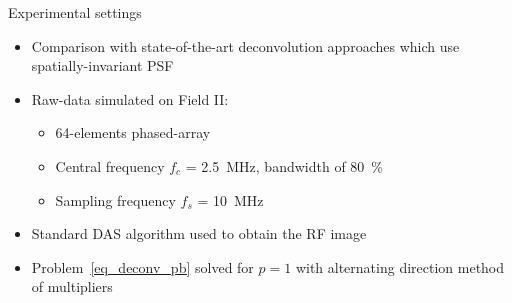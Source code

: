 {%
\begin{block}{Experimental settings}
	\begin{itemize}
		\item Comparison with state-of-the-art deconvolution approaches which use spatially-invariant PSF~\cite{Chen2015}
		\item Raw-data simulated on Field II:
		\begin{itemize}
			\item 64-elements phased-array
			\item Central frequency $f_c$ = \SI{2.5}{\mega\hertz}, bandwidth of \SI{80}{\percent} 
			\item Sampling frequency $f_s$ = \SI{10}{\mega\hertz}
		\end{itemize}
		\item Standard DAS algorithm used to obtain the RF image
		\item Problem~\eqref{eq_deconv_pb} solved for $p=1$ with alternating direction method of multipliers~\cite{Boyd2010}
	\end{itemize}
\end{block}
\vfill

}
